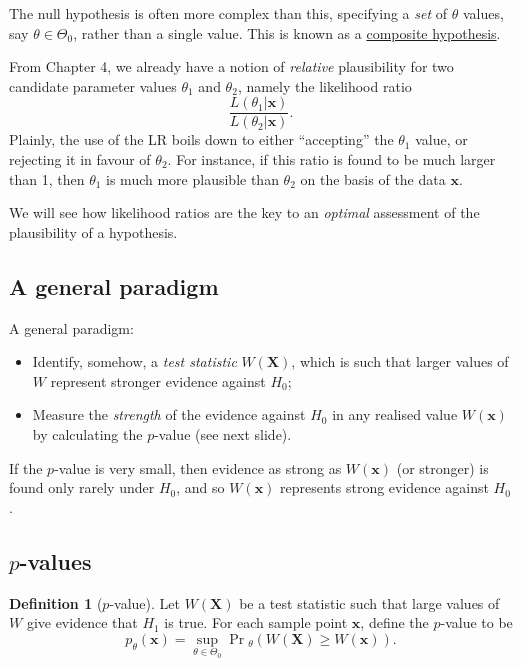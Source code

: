 \documentclass[
]{book}
\newcommand{\bx}{{\boldsymbol x}}
\newcommand{\bX}{{\boldsymbol X}}
\theoremstyle{definition}
\newtheorem{definition}{Definition}[chapter]
\theoremstyle{definition}
\theoremstyle{definition}
\theoremstyle{definition}
\theoremstyle{remark}
\begin{document}
The null hypothesis is often more complex than this, specifying a \emph{set} of \(\theta\) values, say \(\theta\in\Theta_0\), rather than a single value. This is known as a \uline{composite hypothesis}.

From Chapter 4, we already have a notion of \emph{relative} plausibility for two candidate parameter values \(\theta_1\) and \(\theta_2\), namely the likelihood ratio
\[
\frac{L(\theta_1|\bx)}{L(\theta_2|\bx)}.
\]
Plainly, the use of the LR boils down to either ``accepting'' the \(\theta_1\) value, or rejecting it in favour of \(\theta_2\).
For instance, if this ratio is found to be much larger than 1, then \(\theta_1\) is much more plausible than \(\theta_2\) on the basis of the data \(\bx\).

We will see how likelihood ratios are the key to an \emph{optimal} assessment of the plausibility of a hypothesis.

\hypertarget{a-general-paradigm}{%
\subsection{A general paradigm}\label{a-general-paradigm}}

A general paradigm:

\begin{itemize}
\item
  Identify, somehow, a \emph{test statistic} \(W(\bX)\), which is such that larger values of \(W\) represent stronger evidence against \(H_0\);
\item
  Measure the \emph{strength} of the evidence against \(H_0\) in any realised value \(W(\bx)\) by calculating the \(p\)-value (see next slide).
\end{itemize}

If the \(p\)-value is very small, then evidence as strong as \(W(\bx)\) (or stronger) is found only rarely under \(H_0\), and so \(W(\bx)\) represents strong evidence against \(H_0\).

\hypertarget{p-values}{%
\subsection{\texorpdfstring{\(p\)-values}{p-values}}\label{p-values}}

\begin{definition}[\(p\)-value]
\protect\hypertarget{def:pval}{}\label{def:pval}Let \(W(\bX)\) be a test statistic such that large values of \(W\) give evidence that \(H_1\) is true. For each sample point \(\bx\), define the \(p\)-value to be
\[
p_\theta(\bx) = \sup_{\theta\in\Theta_0} \Pr\!{}_\theta\left(W(\bX) \geq W(\bx) \right).
\]
\end{definition}
\end{document}
